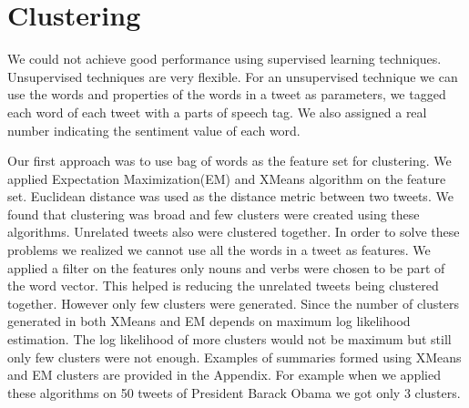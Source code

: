 \section{Clustering}
We could not achieve good performance using supervised learning techniques. Unsupervised techniques are very flexible. For an unsupervised technique we can use the words and properties of the words in a tweet as parameters, we tagged each word of each tweet with a parts of speech tag. We also assigned a real number indicating the sentiment value of each word. 

Our first approach was to use bag of words as the feature set for clustering. We applied Expectation Maximization(EM) and XMeans algorithm on the feature set. Euclidean distance was used as the distance metric between two tweets. We found that clustering was broad and few clusters were created using these algorithms. Unrelated tweets also were clustered together. In order to solve these problems we realized we cannot use all the words in a tweet as features. We applied a filter on the features only nouns and verbs were chosen to be part of the word vector. This helped is reducing the unrelated tweets being clustered together. However only few clusters were generated. Since the number of clusters generated in both XMeans and EM depends on maximum log likelihood estimation. The log likelihood of more clusters would not be maximum but still only few clusters were not enough. Examples of summaries formed using XMeans and EM clusters are provided in the Appendix. For example when we applied these algorithms on 50 tweets of President Barack Obama we got only 3 clusters. 

